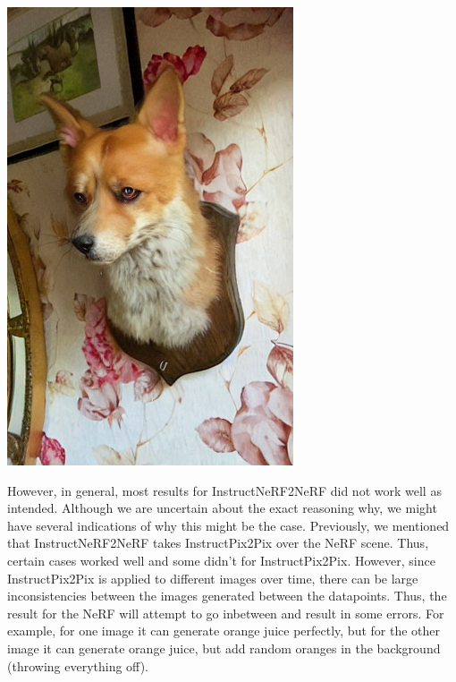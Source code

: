 \documentclass{article}
\begin{document}
\begin{center}
\begin{tcolorbox}
\begin{center}
            \includegraphics[scale=0.15]{images/dog.png}
        \end{center}
    \end{tcolorbox}
\end{center}

However, in general, most results for InstructNeRF2NeRF did not work well as intended. Although we are uncertain about the exact reasoning why, we might have several indications of why this might be the case. Previously, we mentioned that InstructNeRF2NeRF takes InstructPix2Pix over the NeRF scene. Thus, certain cases worked well and some didn't for InstructPix2Pix. However, since InstructPix2Pix is applied to different images over time, there can be large inconsistencies between the images generated between the datapoints. Thus, the result for the NeRF will attempt to go inbetween and result in some errors. For example, for one image it can generate orange juice perfectly, but for the other image it can generate orange juice, but add random oranges in the background (throwing everything off).
\end{document}
